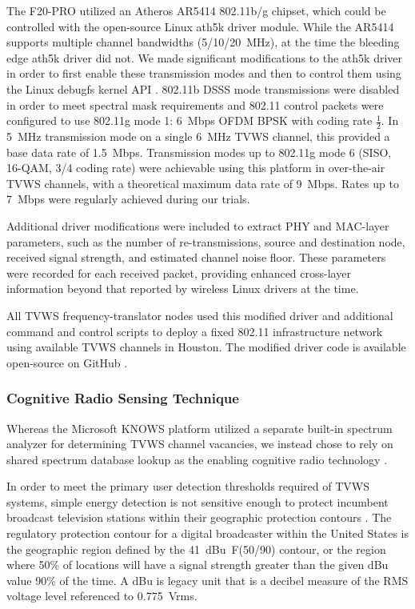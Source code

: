 	The F20-PRO utilized an Atheros AR5414 802.11b/g chipset, which could be controlled with the open-source Linux ath5k driver module.
	While the AR5414 supports multiple channel bandwidths (5/10/20~MHz), at the time the bleeding edge ath5k driver did not.
	We made significant modifications to the ath5k driver in order to first enable these transmission modes and then to control them using the Linux debugfs kernel API \cite{vipin2010analysis}.
	802.11b \ac{DSSS} mode transmissions were disabled in order to meet spectral mask requirements and 802.11 control packets were configured to use 802.11g mode 1: 6~Mbps \ac{OFDM} \ac{BPSK} with coding rate $\frac{1}{2}$.
	In 5~MHz transmission mode on a single 6~MHz \ac{TVWS} channel, this provided a base data rate of 1.5~Mbps.
	Transmission modes up to 802.11g mode 6 (SISO, 16-QAM, 3/4 coding rate) were achievable using this platform in over-the-air \ac{TVWS} channels, with a theoretical maximum data rate of 9~Mbps. Rates up to 7~Mbps were regularly achieved during our trials.
	
	Additional driver modifications were included to extract \ac{PHY} and \ac{MAC}-layer parameters, such as the number of re-transmissions, source and destination node, received signal strength, and estimated channel noise floor.
	These parameters were recorded for each received packet, providing enhanced cross-layer information beyond that reported by wireless Linux drivers at the time.
	
	All \ac{TVWS} frequency-translator nodes used this modified driver and additional command and control scripts to deploy a fixed 802.11 infrastructure network using available \ac{TVWS} channels in Houston.
	The modified driver code is available open-source on GitHub \cite{guerra2013ath5kmod}.
	
\subsubsection{Cognitive Radio Sensing Technique}
	Whereas the Microsoft KNOWS platform \cite{narlanka2007hardware} utilized a separate built-in spectrum analyzer for determining TVWS channel vacancies, we instead chose to rely on shared spectrum database lookup as the enabling cognitive radio technology \cite{flores2013ieee80211af}.

	In order to meet the primary user detection thresholds required of TVWS systems, simple energy detection is not sensitive enough to protect incumbent broadcast television stations within their geographic protection contours \cite{wu2000comparison, gautier2011cyclostationarity, shellhammer2008spectrum}.
	The regulatory protection contour \cite{hessar2015capacity} for a digital broadcaster within the United States is the geographic region defined by the 41~dBu~F(50/90) contour, or the region where 50\% of locations will have a signal strength greater than the given dBu value 90\% of the time.
	A dBu is legacy unit that is a decibel measure of the \ac{RMS} voltage level referenced to 0.775~Vrms.

